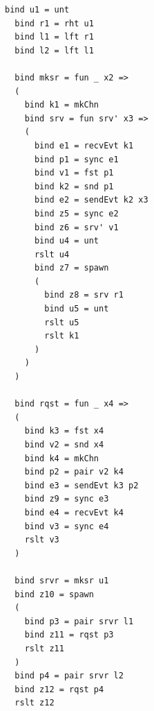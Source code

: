 \documentclass[letterpaper, 11pt]{extarticle}
\begin{document}
\begin{lstlisting}[language=normal_lang, mathescape]
  bind u1 = unt
  bind r1 = rht u1
  bind l1 = lft r1
  bind l2 = lft l1

  bind mksr = fun _ x2 => 
  (
    bind k1 = mkChn
    bind srv = fun srv' x3 =>
    (
      bind e1 = recvEvt k1
      bind p1 = sync e1
      bind v1 = fst p1
      bind k2 = snd p1 
      bind e2 = sendEvt k2 x3
      bind z5 = sync e2
      bind z6 = srv' v1
      bind u4 = unt
      rslt u4
      bind z7 = spawn
      (
        bind z8 = srv r1
        bind u5 = unt
        rslt u5
        rslt k1
      )
    )
  )

  bind rqst = fun _ x4 =>
  (
    bind k3 = fst x4
    bind v2 = snd x4
    bind k4 = mkChn
    bind p2 = pair v2 k4
    bind e3 = sendEvt k3 p2
    bind z9 = sync e3
    bind e4 = recvEvt k4
    bind v3 = sync e4
    rslt v3
  )

  bind srvr = mksr u1
  bind z10 = spawn
  ( 
    bind p3 = pair srvr l1
    bind z11 = rqst p3
    rslt z11
  )
  bind p4 = pair srvr l2
  bind z12 = rqst p4
  rslt z12
\end{lstlisting}
\end{document}
